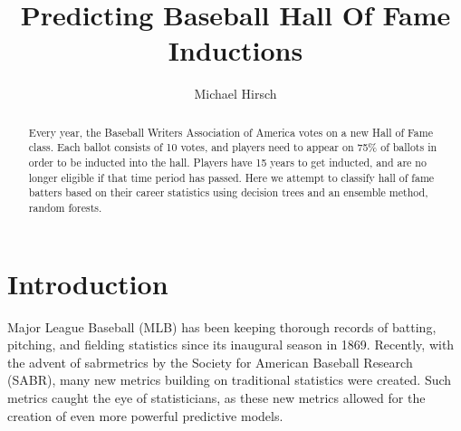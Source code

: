 \documentclass[preprint,12pt]{elsarticle}
\begin{document}
\begin{frontmatter}


\title{Predicting Baseball Hall Of Fame Inductions}




\author{Michael Hirsch}
\address{ILLC, University of Amsterdam}
\address{michaelahirsch@gmail.com}

\begin{abstract}
Every year, the Baseball Writers Association of America votes on a new Hall of Fame class. Each ballot consists of 10 votes, and players need to appear on 75\% of ballots in order to be inducted into the hall. Players have 15 years to get inducted, and are no longer eligible if that time period has passed. Here we attempt to classify hall of fame batters based on their career statistics using decision trees and an ensemble method, random forests.
\end{abstract}


\end{frontmatter}

\section{Introduction}
\label{intro}
Major League Baseball (MLB) has been keeping thorough records of batting, pitching, and fielding statistics since its inaugural season in 1869. Recently, with the advent of sabrmetrics by the Society for American Baseball Research (SABR), many  new metrics building on traditional statistics were created. Such metrics caught the eye of statisticians, as these new metrics allowed for the creation of even more powerful predictive models. 
\end{document}
